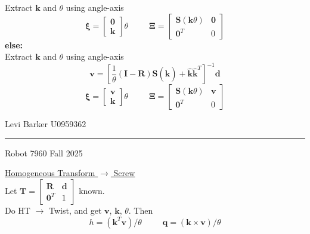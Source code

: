 \documentclass[twocolumn]{article}    %
\begin{document}
\hspace{10pt}Extract \(\bm{k}\) and \(\theta\) using angle-axis
\begin{equation*}
    \bm{\xi} = \begin{bmatrix}
        \bm{0} \\ \bm{k}
    \end{bmatrix}\theta \hspace{30pt} \bm{\Xi} = \begin{bmatrix}
        \bm{S}(\bm{k}\theta) & \bm{0} \\ \bm{0}^T & 0
    \end{bmatrix}
\end{equation*}
\textbf{else:}\\
\hspace{10pt}Extract \(\bm{k}\) and \(\theta\) using angle-axis
\begin{equation*}
    \bm{v} = \left[ \frac{1}{\theta} (\bm{I} - \bm{R})\bm{S}(\hat{\bm{k}}) + \hat{\bm{k}}\hat{\bm{k}}^T \right]^{-1}\bm{d}
\end{equation*}
\begin{equation*}
    \bm{\xi} = \begin{bmatrix}
        \bm{v} \\ \bm{k}
    \end{bmatrix}\theta \hspace{30pt} \bm{\Xi} = \begin{bmatrix}
        \bm{S}(\bm{k}\theta) & \bm{v} \\ \bm{0}^T & 0 
    \end{bmatrix}
\end{equation*}
\vfill
\begin{center}    
    Levi Barker \hspace{82pt} U0959362 \\ \vspace{2pt}
    \hrule
    \vspace{2pt}
    Robot 7960 \hspace{85pt} Fall 2025
\end{center}

\newpage
\noindent\underline{Homogeneous Transform \(\longrightarrow\) Screw}\\
Let \(\bm{T} =\begin{bmatrix}
    \bm{R} & \bm{d} \\ \bm{0}^T & 1
\end{bmatrix}\) known.\\
Do HT \(\longrightarrow\) Twist, and get \(\bm{v}\), \(\bm{k}\), \(\theta\). Then 
\begin{equation*}
    h = (\bm{k}^T\bm{v})/\theta \hspace{30pt} \bm{q} =  (\bm{k}\times \bm{v})/ \theta
\end{equation*}
\end{document}
